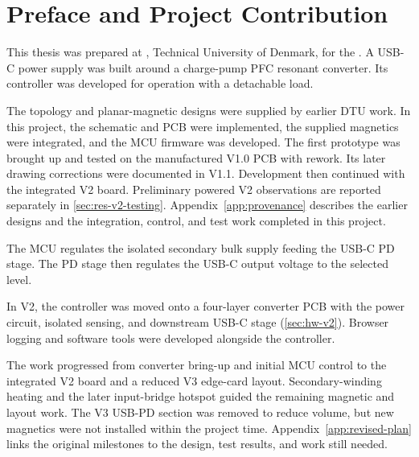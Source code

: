 \section*{Preface and Project Contribution}

This thesis was prepared at \department, Technical University of Denmark, for the \degreeprogramme. A USB-C power supply was built around a charge-pump PFC resonant converter. Its controller was developed for operation with a detachable load.

The topology and planar-magnetic designs were supplied by earlier DTU work. In this project, the schematic and PCB were implemented, the supplied magnetics were integrated, and the MCU firmware was developed. The first prototype was brought up and tested on the manufactured V1.0 PCB with rework. Its later drawing corrections were documented in V1.1. Development then continued with the integrated V2 board. Preliminary powered V2 observations are reported separately in \cref{sec:res-v2-testing}. Appendix~\ref{app:provenance} describes the earlier designs and the integration, control, and test work completed in this project.

The MCU regulates the isolated secondary bulk supply feeding the USB-C PD stage. The PD stage then regulates the USB-C output voltage to the selected level.

In V2, the controller was moved onto a four-layer converter PCB with the power circuit, isolated sensing, and downstream USB-C stage (\cref{sec:hw-v2}). Browser logging and software tools were developed alongside the controller.

The work progressed from converter bring-up and initial MCU control to the integrated V2 board and a reduced V3 edge-card layout. Secondary-winding heating and the later input-bridge hotspot guided the remaining magnetic and layout work. The V3 USB-PD section was removed to reduce volume, but new magnetics were not installed within the project time. Appendix~\ref{app:revised-plan} links the original milestones to the design, test results, and work still needed.

\vfill
\begin{center}
\namesigdate{\thesisauthor~-~\studentnumber}
\end{center}
\vfill

